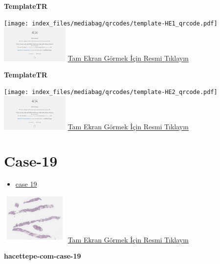 \documentclass[
  letterpaper,
  DIV=11,
  numbers=noendperiod]{scrreprt}
\providecommand{\tightlist}{%
  \setlength{\itemsep}{0pt}\setlength{\parskip}{0pt}}\usepackage{longtable,booktabs,array}
\begin{document}
\textbf{TemplateTR}

\texttt{[image: index\_files/mediabag/qrcodes/template-HE1\_qrcode.pdf]}
\href{https://images.patolojiatlasi.com/template/HE1.html}{\includegraphics[width=0.25\textwidth,height=\textheight]{./screenshots/thumbnail_template-HE1.png}}
\href{https://images.patolojiatlasi.com/template/HE1.html}{Tam Ekran
Görmek İçin Resmi Tıklayın}

\textbf{TemplateTR}

\texttt{[image: index\_files/mediabag/qrcodes/template-HE2\_qrcode.pdf]}
\href{https://images.patolojiatlasi.com/template/HE2.html}{\includegraphics[width=0.25\textwidth,height=\textheight]{./screenshots/thumbnail_template-HE2.png}}
\href{https://images.patolojiatlasi.com/template/HE2.html}{Tam Ekran
Görmek İçin Resmi Tıklayın}

\hypertarget{sec-hacettepe-case-of-the-month-case-19}{%
\section{Case-19}\label{sec-hacettepe-case-of-the-month-case-19}}

\begin{itemize}
\tightlist
\item
  \href{https://www.youtube.com/watch?v=SaNDCvKzQ6M&ab_channel=KemalKosemehmetoglu}{case
  19}
\end{itemize}

\href{https://images.patolojiatlasi.com/hacettepe-com-case-1/HE.html}{\includegraphics[width=0.25\textwidth,height=\textheight]{./screenshots/thumbnail_hacettepe-com-case-19.png}}
\href{https://images.patolojiatlasi.com/hacettepe-com-case-19/HE.html}{Tam
Ekran Görmek İçin Resmi Tıklayın}

\textbf{hacettepe-com-case-19}
\end{document}
